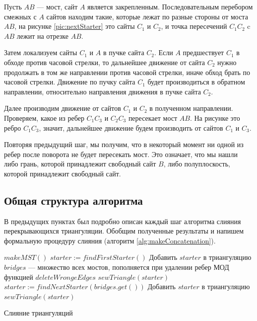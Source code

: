 \documentclass[12pt]{article}
\begin{document}
Пусть $AB$ --- мост, сайт $A$ является закрепленным. Последовательным перебором смежных с $A$ сайтов находим такие, которые лежат по разные стороны от моста $AB$, на рисунке \ref{pic:nextStarter} это сайты $C_1$ и $C_2$, и точка пересечений $C_1C_2$ c $AB$ лежит на отрезке $AB$.

Затем локализуем сайты $C_1$ и $A$ в пучке сайта $C_2$. Если $A$ предшествует $C_1$ в обходе против часовой стрелки, то дальнейшее движение от сайта $C_2$ нужно продолжать в том же направлении против часовой стрелки, иначе обход брать по часовой стрелки. Движение по пучку сайта $C_1$ будет производиться в обратном направлении, относительно направления движения в пучке сайта $C_2$.

Далее производим движение от сайтов $C_1$ и $C_2$ в полученном направлении. Проверяем, какое из ребер $C_1C_3$ и $C_2C_3$ пересекает мост $AB$. На рисунке это ребро $C_1C_3$, значит, дальнейшее движение будем производить от сайтов $C_1$ и $C_3$.

Повторяя предыдущий шаг, мы получим, что в некоторый момент ни одной из ребер после поворота не будет пересекать мост. Это означает, что мы нашли либо грань, которой принадлежит свободный сайт $B$, либо полуплоскость, которой принадлежит свободный сайт.

\subsection{Общая структура алгоритма}
В предыдущих пунктах был подробно описан каждый шаг алгоритма слияния перекрывающихся триангуляции.
Обобщим полученные результаты и напишем формальную процедуру слияния (алгоритм \ref{alg:makeConcatenation}).

\begin{algorithm}[htb!]
\begin{algorithmic}[1]
	\State $makeMST()$
	\State $starter := findFirstStarter()$
	\State Добавить $starter$ в триангуляцию
	\State $bridges$ --- множество всех мостов, пополняется при удалении ребер МОД функцией $deleteWrongeEdges$
	\State $sewTriangle(starter)$
		\State $starter := findNextStarter(bridges.get())$
		\State Добавить $starter$ в триангуляцию
		\State $sewTriangle(starter)$
	\EndWhile
\EndProcedure
\end{algorithmic}
\caption{Слияние триангуляций}
\label{alg:makeConcatenation}
\end{algorithm}
\end{document}
